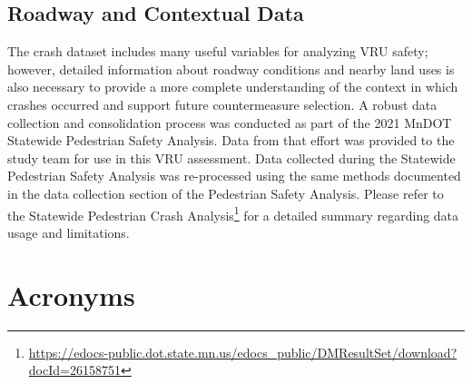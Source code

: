 \documentclass[
  letterpaper,
]{scrbook}
\begin{document}
\hypertarget{roadway-and-contextual-data}{%
\section{Roadway and Contextual
Data}\label{roadway-and-contextual-data}}

The crash dataset includes many useful variables for analyzing VRU
safety; however, detailed information about roadway conditions and
nearby land uses is also necessary to provide a more complete
understanding of the context in which crashes occurred and support
future countermeasure selection. A robust data collection and
consolidation process was conducted as part of the 2021 MnDOT Statewide
Pedestrian Safety Analysis. Data from that effort was provided to the
study team for use in this VRU assessment. Data collected during the
Statewide Pedestrian Safety Analysis was re-processed using the same
methods documented in the data collection section of the Pedestrian
Safety Analysis. Please refer to the Statewide Pedestrian Crash
Analysis\footnote{\url{https://edocs-public.dot.state.mn.us/edocs_public/DMResultSet/download?docId=26158751}}
for a detailed summary regarding data usage and limitations.

\appendix
{}

\hypertarget{acronyms}{%
\chapter{Acronyms}\label{acronyms}}
\end{document}
